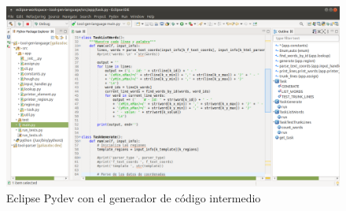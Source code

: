 \begin{figure}[hp!]
    \centering
    \includegraphics[angle=90,height=1.6\textwidth]{imaxes/z-adicional/tool-gen-language-pydev.png}
    \caption{Eclipse Pydev con el generador de código intermedio}
    \label{fig:tool-gen-language-pydev}
\end{figure}

